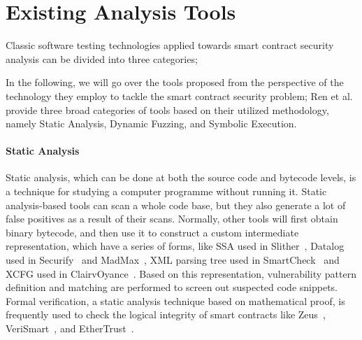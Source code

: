 \section{Existing Analysis Tools}

Classic software testing technologies applied towards smart contract security analysis can be divided into three categories;

In the following, we will go over the tools proposed from the perspective of the technology they employ to tackle the smart contract security problem;
Ren et al.~\cite{Empirical-Evaluation-of-Smart-Contract-Testing:What-is-the-Best-Choice} provide three broad categories of tools based on their utilized methodology, namely Static Analysis, Dynamic Fuzzing, and Symbolic Execution.

\paragraph{Static Analysis}
Static analysis, which can be done at both the source code and bytecode levels, is a technique for studying a computer programme without running it.
Static analysis-based tools can scan a whole code base, but they also generate a lot of false positives as a result of their scans.
Normally, other tools will first obtain binary bytecode, and then use it to construct a custom intermediate representation, which have a series of forms,
like SSA used in Slither~\cite{slither}, Datalog used in Securify~\cite{securify} and MadMax~\cite{madmax}, XML parsing tree used in SmartCheck~\cite{smartcheck} and
XCFG used in ClairvOyance~\cite{ClairvOyance}.
Based on this representation, vulnerability pattern definition and matching are performed to screen out suspected code snippets.
Formal verification, a static analysis technique based on mathematical proof, is frequently used to check the logical integrity of smart contracts
like Zeus~\cite{kalra2018zeus}, VeriSmart~\cite{verismart}, and EtherTrust~\cite{etehrTrust}.

